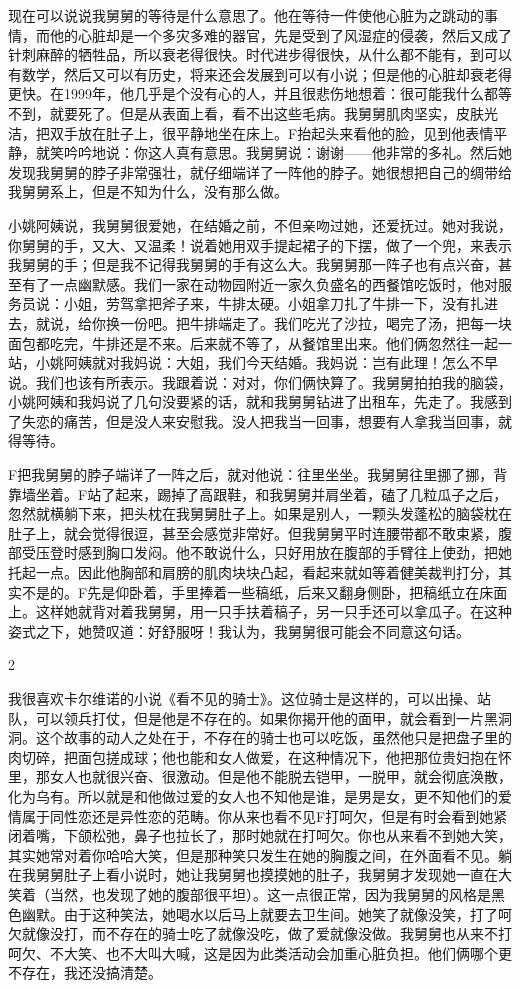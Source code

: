 现在可以说说我舅舅的等待是什么意思了。他在等待一件使他心脏为之跳动的事情，而他的心脏却是一个多灾多难的器官，先是受到了风湿症的侵袭，然后又成了针刺麻醉的牺牲品，所以衰老得很快。时代进步得很快，从什么都不能有，到可以有数学，然后又可以有历史，将来还会发展到可以有小说；但是他的心脏却衰老得更快。在1999年，他几乎是个没有心的人，并且很悲伤地想着：很可能我什么都等不到，就要死了。但是从表面上看，看不出这些毛病。我舅舅肌肉坚实，皮肤光洁，把双手放在肚子上，很平静地坐在床上。F抬起头来看他的脸，见到他表情平静，就笑吟吟地说：你这人真有意思。我舅舅说：谢谢——他非常的多礼。然后她发现我舅舅的脖子非常强壮，就仔细端详了一阵他的脖子。她很想把自己的绸带给我舅舅系上，但是不知为什么，没有那么做。 

小姚阿姨说，我舅舅很爱她，在结婚之前，不但亲吻过她，还爱抚过。她对我说，你舅舅的手，又大、又温柔！说着她用双手提起裙子的下摆，做了一个兜，来表示我舅舅的手；但是我不记得我舅舅的手有这么大。我舅舅那一阵子也有点兴奋，甚至有了一点幽默感。我们一家在动物园附近一家久负盛名的西餐馆吃饭时，他对服务员说：小姐，劳驾拿把斧子来，牛排太硬。小姐拿刀扎了牛排一下，没有扎进去，就说，给你换一份吧。把牛排端走了。我们吃光了沙拉，喝完了汤，把每一块面包都吃完，牛排还是不来。后来就不等了，从餐馆里出来。他们俩忽然往一起一站，小姚阿姨就对我妈说：大姐，我们今天结婚。我妈说：岂有此理！怎么不早说。我们也该有所表示。我跟着说：对对，你们俩快算了。我舅舅拍拍我的脑袋，小姚阿姨和我妈说了几句没要紧的话，就和我舅舅钻进了出租车，先走了。我感到了失恋的痛苦，但是没人来安慰我。没人把我当一回事，想要有人拿我当回事，就得等待。 

F把我舅舅的脖子端详了一阵之后，就对他说：往里坐坐。我舅舅往里挪了挪，背靠墙坐着。F站了起来，踢掉了高跟鞋，和我舅舅并肩坐着，磕了几粒瓜子之后，忽然就横躺下来，把头枕在我舅舅肚子上。如果是别人，一颗头发蓬松的脑袋枕在肚子上，就会觉得很逗，甚至会感觉非常好。但我舅舅平时连腰带都不敢束紧，腹部受压登时感到胸口发闷。他不敢说什么，只好用放在腹部的手臂往上使劲，把她托起一点。因此他胸部和肩膀的肌肉块块凸起，看起来就如等着健美裁判打分，其实不是的。F先是仰卧着，手里捧着一些稿纸，后来又翻身侧卧，把稿纸立在床面上。这样她就背对着我舅舅，用一只手扶着稿子，另一只手还可以拿瓜子。在这种姿式之下，她赞叹道：好舒服呀！我认为，我舅舅很可能会不同意这句话。 

2 

我很喜欢卡尔维诺的小说《看不见的骑士》。这位骑士是这样的，可以出操、站队，可以领兵打仗，但是他是不存在的。如果你揭开他的面甲，就会看到一片黑洞洞。这个故事的动人之处在于，不存在的骑士也可以吃饭，虽然他只是把盘子里的肉切碎，把面包搓成球；他也能和女人做爱，在这种情况下，他把那位贵妇抱在怀里，那女人也就很兴奋、很激动。但是他不能脱去铠甲，一脱甲，就会彻底涣散，化为乌有。所以就是和他做过爱的女人也不知他是谁，是男是女，更不知他们的爱情属于同性恋还是异性恋的范畴。你从来也看不见F打呵欠，但是有时会看到她紧闭着嘴，下颌松弛，鼻子也拉长了，那时她就在打呵欠。你也从来看不到她大笑，其实她常对着你哈哈大笑，但是那种笑只发生在她的胸腹之间，在外面看不见。躺在我舅舅肚子上看小说时，她让我舅舅也摸摸她的肚子，我舅舅才发现她一直在大笑着（当然，也发现了她的腹部很平坦）。这一点很正常，因为我舅舅的风格是黑色幽默。由于这种笑法，她喝水以后马上就要去卫生间。她笑了就像没笑，打了呵欠就像没打，而不存在的骑士吃了就像没吃，做了爱就像没做。我舅舅也从来不打呵欠、不大笑、也不大叫大喊，这是因为此类活动会加重心脏负担。他们俩哪个更不存在，我还没搞清楚。 

